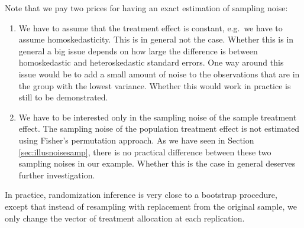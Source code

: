 \documentclass[]{book}
\providecommand{\tightlist}{%
  \setlength{\itemsep}{0pt}\setlength{\parskip}{0pt}}
\theoremstyle{definition}
\theoremstyle{definition}
\theoremstyle{definition}
\theoremstyle{remark}
\let\BeginKnitrBlock\begin \let\EndKnitrBlock\end
\begin{document}
\BeginKnitrBlock{remark}
\iffalse{} {Remark. } \fi{}Note that we pay two prices for having an
exact estimation of sampling noise:
\EndKnitrBlock{remark}

\begin{enumerate}
\def\labelenumi{\arabic{enumi}.}
\tightlist
\item
  We have to assume that the treatment effect is constant, e.g.~we have
  to assume homoskedasticity. This is in general not the case. Whether
  this is in general a big issue depends on how large the difference is
  between homoskedastic and heteroskedastic standard errors. One way
  around this issue would be to add a small amount of noise to the
  observations that are in the group with the lowest variance. Whether
  this would work in practice is still to be demonstrated.
\item
  We have to be interested only in the sampling noise of the sample
  treatment effect. The sampling noise of the population treatment
  effect is not estimated using Fisher's permutation approach. As we
  have seen in Section \ref{sec:illusnoisesamp}, there is no practical
  difference between these two sampling noises in our example. Whether
  this is the case in general deserves further investigation.
\end{enumerate}

\BeginKnitrBlock{example}
\protect\hypertarget{exm:unnamed-chunk-63}{}{\label{exm:unnamed-chunk-63}
}In practice, randomization inference is very close to a bootstrap
procedure, except that instead of resampling with replacement from the
original sample, we only change the vector of treatment allocation at
each replication.
\EndKnitrBlock{example}
\end{document}
